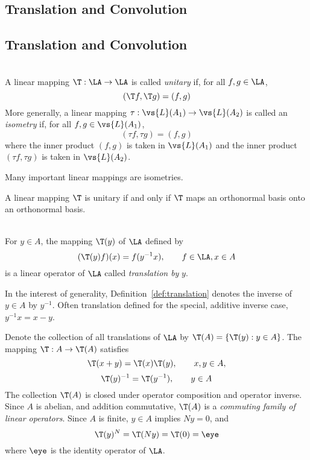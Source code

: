 {\subsection{Translation and Convolution}}
{\subsection{Translation and Convolution\protect\footnotemark}
}
\label{sec:trans-conv}
\begin{definition}\\
A linear mapping $\T: \LA \to \LA$ is called \emph{unitary} if, for all
$f, g \in \LA$,
\[
(\T f,\T g) = (f,g)
\]
More generally, a linear mapping $\tau: \vs{L}(A_1) \to \vs{L}(A_2)$ is called
an \emph{isometry} if, for all $f, g \in \vs{L}(A_1)$, 
\[
(\tau f,\tau g) = (f,g)
\]
where the inner product $(f,g)$ is taken in $\vs{L}(A_1)$ and the inner product
$(\tau f,\tau g)$ is taken in $\vs{L}(A_2)$.
\end{definition}
Many important linear mappings are isometries.
\begin{theorem}\label{thm:unitary}
A linear mapping $\T$ is unitary if and only if $\T$ maps an orthonormal basis
onto an orthonormal basis.
\end{theorem}

\begin{definition}[Translation]\label{def:translation}\\
For $y\in A$, the mapping $\T(y)$ of $\LA$ defined by
\[
(\T(y)f)(x) = f(y^{-1}x), \qquad f \in \LA, x \in A
\]
is a linear operator of $\LA$ called \emph{translation by} $y$.  
\end{definition}
In the interest of generality, Definition~\ref{def:translation} denotes the 
inverse of $y\in A$ by $y^{-1}$.  Often translation defined for the special,
additive inverse case, $y^{-1}x = x-y$.

Denote the collection of all translations of $\LA$ by 
$\T(A) = \{\T(y) : y\in A\}$.  The mapping $\T :A \to \T(A)$
satisfies 
\[
\T(x+y) = \T(x)\T(y), \qquad x,y \in A,
\]
\[
\T(y)^{-1} = \T(y^{-1}), \qquad y \in A
\]
The collection $\T(A)$ is closed under operator composition and operator inverse.  
Since $A$ is abelian, and addition commutative, 
$\T(A)$ is a {\it commuting family of linear operators}.
Since $A$ is finite, $y\in A$ implies $Ny = 0$, and
\[
\T(y)^N =  \T(Ny) =  \T(0) = \eye
\]
where $\eye$ is the identity operator of $\LA$.

